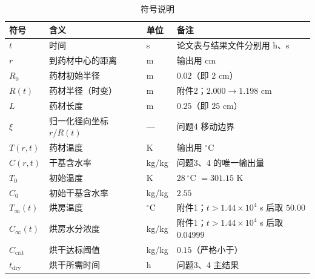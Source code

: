 
\begin{table}[htbp]
  \centering
  \small
  \caption{符号说明}
  \label{tab:symbols}
  \begin{tabular}{llll}
    \toprule
    符号 & 含义 & 单位 & 备注 \\
    \midrule
    $t$                       & 时间                       & s                       & 论文表与结果文件分别用 h、s \\
    $r$                       & 到药材中心的距离            & m                       & 输出用 cm \\
    $R_0$                     & 药材初始半径                & m                       & $0.02$（即 $2$ cm） \\
    $R(t)$                    & 药材半径（时变）            & m                       & 附件2；$2.000\to1.198$ cm \\
    $L$                       & 药材长度                    & m                       & $0.25$（即 $25$ cm） \\
    $\xi$                     & 归一化径向坐标 $r/R(t)$     & ---                     & 问题4 移动边界 \\
    \midrule
    $T(r,t)$                  & 药材温度                    & K                       & 输出用 $^\circ$C \\
    $C(r,t)$                  & 干基含水率                  & kg/kg                   & 问题3、4 的唯一输出量 \\
    $T_0$                     & 初始温度                    & K                       & $28\ ^\circ$C $=301.15$ K \\
    $C_0$                     & 初始干基含水率              & kg/kg                   & $2.55$ \\
    $T_\infty(t)$             & 烘房温度                    & $^\circ$C               & 附件1；$t>1.44\times10^4$ s 后取 $50.00$ \\
    $C_\infty(t)$             & 烘房水分浓度                & kg/kg                   & 附件1；$t>1.44\times10^4$ s 后取 $0.04999$ \\
    $C_{\mathrm{crit}}$       & 烘干达标阈值                & kg/kg                   & $0.15$（严格小于） \\
    $t_{\mathrm{dry}}$        & 烘干所需时间                & h                       & 问题3、4 主结果 \\

\end{tabular}
\end{table}
